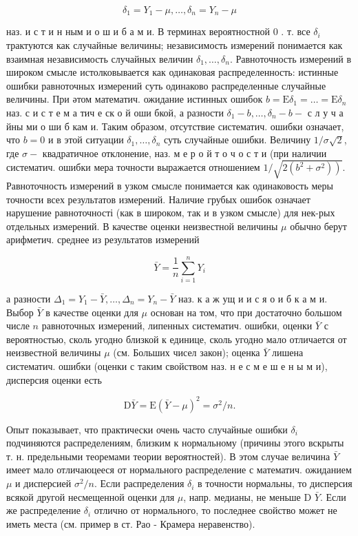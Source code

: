 \documentclass[10pt]{article}
\begin{document}
\[
\delta_{1}=Y_{1}-\mu, \ldots, \delta_{n}=Y_{n}-\mu
\]

наз. и с т и н ным и о ш и б а м и. В терминах вероятностной 0 . т. все $\delta_{i}$ трактуются как случайные величины; независимость измерений понимается как взаимная независимость случайных величин $\delta_{1}, \ldots, \delta_{n}$. Равноточность измерений в широком смысле истолковывается как одинаковая распределенность: истинные ошибки равноточных измерений суть одинаково распределенные случайные величины. При әтом математич. ожидание истинных ошибок $b=\mathrm{E} \delta_{1}=\ldots=\mathrm{E} \delta_{n}$ наз. с и с т е м а тич е ск о й оши бкой, а разности $\delta_{1}-b, \ldots, \delta_{n}-b-$ с л у ч а йны ми о ши б кам и. Таким образом, отсутствие систематич. ошибки означает, что $b=0$ и в этой ситуации $\delta_{1}, \ldots, \delta_{n}$ суть случайные ошибки. Величину $1 / \sigma \sqrt{2}$, где $\sigma-$ квадратичное отклонение, наз. м е р о й т о ч о с т и (при наличии систематич. ошибки мера точности выражается отношением $1 / \sqrt{\left.2\left(b^{2}+\sigma^{2}\right)\right)}$. Равноточность измерений в узком смысле понимается как одинаковость меры точности всех результатов измерений. Наличие грубых ошибок означает нарушение равноточності (как в широком, так и в узком смысле) для нек-рых отдельных измерений. В качестве оценки неизвестной величины $\mu$ обычно берут арифметич. среднее из результатов измерений

\[
\bar{Y}=\frac{1}{n} \sum_{i=1}^{n} Y_{i}
\]

а разности $\Delta_{1}=Y_{1}-\bar{Y}, \ldots, \Delta_{n}=Y_{n}-\bar{Y}$ наз. к а ж ущ и и с я о и б к а м и. Выбор $\bar{Y}$ в качестве оценки для $\mu$ основан на том, что при достаточно большом числе $n$ равноточных измерений, липенных систематич. ошибки, оценки $\bar{Y}$ с вероятностью, сколь угодно близкой к единице, сколь угодно мало отличается от неизвестной величины $\mu$ (см. Больших чисел закон); оценка $\bar{Y}$ лишена систематич. ошибки (оценки с таким свойством наз. н е с м е ш е н ы м и), дисперсия оценки есть

\[
\mathrm{D} \bar{Y}=\mathrm{E}(\bar{Y}-\mu)^{2}=\sigma^{2} / n .
\]

Опыт показывает, что практически очень часто случайные ошибки $\delta_{i}$ подчиняются распределениям, близким к нормальному (причины этого вскрыты т. н. предельными теоремами теории вероятностей). В этом случае величина $\bar{Y}$ имеет мало отличаюцееся от нормального распределение с математич. ожиданием $\mu$ и дисперсией $\sigma^{2} / n$. Если распределения $\delta_{i}$ в точности нормальны, то дисперсия всякой другой несмещенной оценки для $\mu$, напр. медианы, не меньше D $\bar{Y}$. Если же распределение $\delta_{i}$ отлично от нормального, то последнее свойство может не иметь места (см. пример в ст. Рао - Крамера неравенство).
\end{document}
